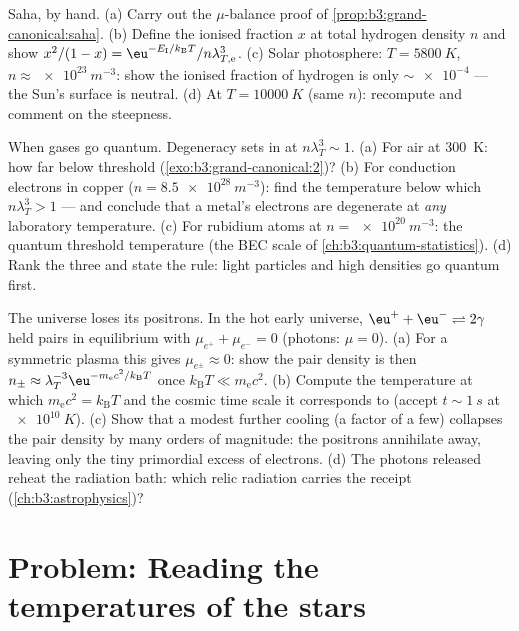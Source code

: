 \begin{exercise}[$\star\star\star$]\label{exo:b3:grand-canonical:10}
Saha, by hand. (a) Carry out the $\mu$-balance proof of
\cref{prop:b3:grand-canonical:saha}. (b) Define the ionised
fraction $x$ at total hydrogen density $n$ and show $x^2/(1 - x)
= \eu^{-E_{\text{I}}/k_{\text{B}}T}/n\lambda_{T,\text{e}}^3$. (c)
Solar photosphere: $T = \qty{5800}{K}$, $n \approx
\qty{e23}{m^{-3}}$: show the ionised fraction of hydrogen is only
$\sim\num{e-4}$ --- the Sun's surface is neutral. (d) At $T =
\qty{10000}{K}$ (same $n$): recompute and comment on the
steepness.
\end{exercise}

\begin{exercise}[$\star\star\star$]\label{exo:b3:grand-canonical:11}
When gases go quantum. Degeneracy sets in at $n\lambda_T^3 \sim
1$. (a) For air at \qty{300}{K}: how far below threshold
(\cref{exo:b3:grand-canonical:2})? (b) For conduction electrons
in copper ($n = \qty{8.5e28}{m^{-3}}$): find the temperature
below which $n\lambda_T^3 > 1$ --- and conclude that a metal's
electrons are degenerate at \emph{any} laboratory temperature.
(c) For rubidium atoms at $n = \qty{e20}{m^{-3}}$: the quantum
threshold temperature (the BEC scale of
\cref{ch:b3:quantum-statistics}). (d) Rank the three and state the
rule: light particles and high densities go quantum first.
\end{exercise}

\begin{exercise}[$\star\star\star$]\label{exo:b3:grand-canonical:12}
The universe loses its positrons. In the hot early universe,
$\eu^+ + \eu^- \rightleftharpoons 2\gamma$ held pairs in
equilibrium with $\mu_{e^+} + \mu_{e^-} = 0$ (photons: $\mu = 0$).
(a) For a symmetric plasma this gives $\mu_{e^\pm} \approx 0$:
show the pair density is then $n_\pm \approx
\lambda_T^{-3}\eu^{-m_{\text{e}}c^2/k_{\text{B}}T}$ once
$k_{\text{B}}T \ll m_{\text{e}}c^2$. (b) Compute the temperature
at which $m_{\text{e}}c^2 = k_{\text{B}}T$ and the cosmic time
scale it corresponds to (accept $t \sim \qty{1}{s}$ at
$\qty{e10}{K}$). (c) Show that a modest further cooling (a factor
of a few) collapses the pair density by many orders of magnitude:
the positrons annihilate away, leaving only the tiny primordial
excess of electrons. (d) The photons released reheat the
radiation bath: which relic radiation carries the receipt
(\cref{ch:b3:astrophysics})?
\end{exercise}

\section{Problem: Reading the temperatures of the stars}

